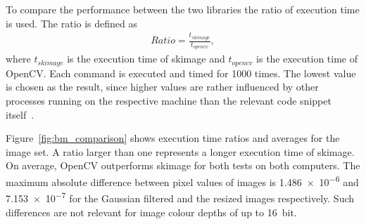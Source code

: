 To compare the performance between the two libraries the ratio of execution time is used. The ratio is defined as
\begin{align}
    Ratio = \frac{t_{skimage}}{t_{opencv}}, \label{eq:bm_exec_ratio}
\end{align}
where $t_{skimage}$ is the execution time of \gls{skimage} and $t_{opencv}$ is the execution time of OpenCV. Each command is executed and timed for 1000 times. The lowest value is chosen as the result, since higher values are rather influenced by other processes running on the respective machine than the relevant code snippet itself~\cite{timeit2020}.

Figure~\ref{fig:bm_comparison} shows execution time ratios and averages for the image set. A ratio larger than one represents a longer execution time of \gls{skimage}. On average, OpenCV outperforms \gls{skimage} for both tests on both computers. The maximum absolute difference between pixel values of images is \SI{1.486e-6}{} and \SI{7.153e-7}{} for the Gaussian filtered and the resized images respectively. Such differences are not relevant for image colour depths of up to \SI{16}{bit}.


